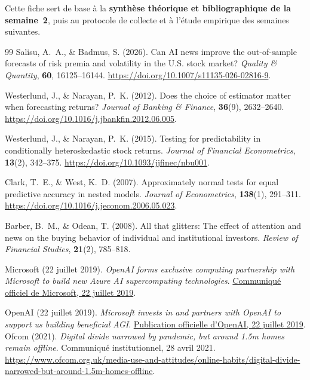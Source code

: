 \documentclass[11pt,a4paper]{article}
\begin{document}
Cette fiche sert de base à la \textbf{synthèse théorique et bibliographique de la semaine~2}, puis au protocole de collecte et à l'étude empirique des semaines suivantes.

\clearpage
\renewcommand{\refname}{Références bibliographiques}
{}
\begin{thebibliography}{99}
Salisu, A.~A., \& Badmus, S. (2026).
\newblock Can AI news improve the out-of-sample forecasts of risk premia and volatility in the U.S. stock market?
\newblock \emph{Quality \& Quantity}, \textbf{60}, 16125--16144.
\newblock \url{https://doi.org/10.1007/s11135-026-02816-9}.

Westerlund, J., \& Narayan, P.~K. (2012).
\newblock Does the choice of estimator matter when forecasting returns?
\newblock \emph{Journal of Banking \& Finance}, \textbf{36}(9), 2632--2640.
\newblock \url{https://doi.org/10.1016/j.jbankfin.2012.06.005}.

Westerlund, J., \& Narayan, P.~K. (2015).
\newblock Testing for predictability in conditionally heteroskedastic stock returns.
\newblock \emph{Journal of Financial Econometrics}, \textbf{13}(2), 342--375.
\newblock \url{https://doi.org/10.1093/jjfinec/nbu001}.

Clark, T.~E., \& West, K.~D. (2007).
\newblock Approximately normal tests for equal predictive accuracy in nested models.
\newblock \emph{Journal of Econometrics}, \textbf{138}(1), 291--311.
\newblock \url{https://doi.org/10.1016/j.jeconom.2006.05.023}.

Barber, B.~M., \& Odean, T. (2008).
\newblock All that glitters: The effect of attention and news on the buying behavior of individual and institutional investors.
\newblock \emph{Review of Financial Studies}, \textbf{21}(2), 785--818.

Microsoft (22 juillet 2019).
\newblock \emph{OpenAI forms exclusive computing partnership with Microsoft to build new Azure AI supercomputing technologies}.
\newblock \href{https://news.microsoft.com/source/2019/07/22/openai-forms-exclusive-computing-partnership-with-microsoft-to-build-new-azure-ai-supercomputing-technologies/}{Communiqué officiel de Microsoft, 22 juillet 2019}.

OpenAI (22 juillet 2019).
\newblock \emph{Microsoft invests in and partners with OpenAI to support us building beneficial AGI}.
\newblock \href{https://openai.com/index/microsoft-invests-in-and-partners-with-openai/}{Publication officielle d'OpenAI, 22 juillet 2019}.
Ofcom (2021).
\newblock \emph{Digital divide narrowed by pandemic, but around 1.5m homes remain offline}.
\newblock Communiqué institutionnel, 28 avril 2021.
\newblock \url{https://www.ofcom.org.uk/media-use-and-attitudes/online-habits/digital-divide-narrowed-but-around-1.5m-homes-offline}.


\end{thebibliography}
\end{document}
